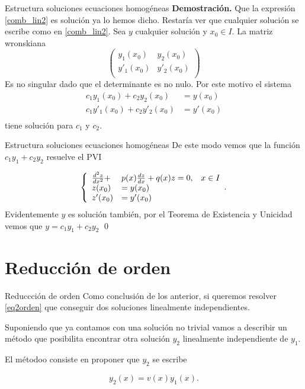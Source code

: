 \documentclass[handout,hyperref={colorlinks=true}]{beamer}
\newcommand{\nl}{\onslide<+-> }
\begin{document}
\begin{frame}{Estructura soluciones ecuaciones homogéneas}
\textbf{Demostración.} Que la expresión \eqref{comb_lin2} es solución ya lo hemos dicho.   Restaría ver que cualquier solución se escribe como en \eqref{comb_lin2}. 
Sea $y$ cualquier solución y $x_0\in I$. La matriz wronskiana
\[\begin{pmatrix}
   y_1(x_0)  & y_2(x_0)\\
   y'_1(x_0)  & y'_2(x_0)\\   
  \end{pmatrix}
\]
Es no singular dado que el determinante es no nulo. Por este motivo el sistema
\[ \begin{split}
  c_1 y_1(x_0) + c_2y_2(x_0) &=y(x_0)\\
   c_1y'_1(x_0)  + c_2y'_2(x_0) &=y'(x_0)\\
  \end{split}
\]
tiene solución para $c_1$ y $c_2$. 
\end{frame}


\begin{frame}{Estructura soluciones ecuaciones homogéneas}
De este modo vemos que la función  $c_1y_1+c_2y_2$ resuelve el PVI

 \[\left\{
 \begin{array}{l l l}
   \frac{d^2z}{dx^2}+&p(x)\frac{dz}{dx}+q(x)z=0,&x\in I\\
   z(x_0)&=y(x_0)&\\
   z'(x_0)&=y'(x_0)&\\ 
  \end{array}.\right.
\]
Evidentemente $y$ es solución también, por el Teorema de Existencia y Unicidad vemos que $y=c_1y_1+c_2y_2$ \qed
\end{frame}

\section{Reducción de orden}
\begin{frame}{Reduccción de orden}
\nl Como conclusión de los anterior, si queremos resolver \eqref{eq2orden} que conseguir  dos soluciones linealmente independientes.

\nl Suponiendo que ya contamos con una solución no trivial vamos a describir un método 
  que posibilita  encontrar otra solución $y_2$ linealmente independiente de $y_1$. 
  
\nl El métodoo consiste en proponer que $y_2$ se escribe

\[\boxed{y_2(x)=v(x)y_1(x)}.\]


\end{frame}
\end{document}
